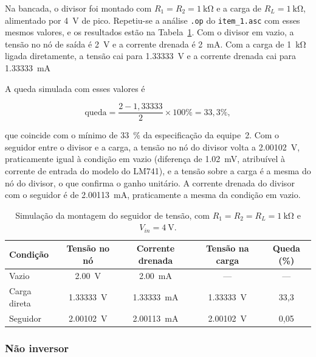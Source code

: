 \documentclass[11pt,a4paper]{article}
\begin{document}
Na bancada, o divisor foi montado com $R_1 = R_2 = \SI{1}{\kilo\ohm}$ e a carga de $R_L = \SI{1}{\kilo\ohm}$, alimentado por \SI{4}{\volt} de pico. Repetiu-se a análise \texttt{.op} do \texttt{item\_1.asc} com esses mesmos valores, e os resultados estão na Tabela~\ref{tab:seguidor_sim_bancada}. Com o divisor em vazio, a tensão no nó de saída é \SI{2}{\volt} e a corrente drenada é \SI{2}{\milli\ampere}. Com a carga de \SI{1}{\kilo\ohm} ligada diretamente, a tensão cai para \SI{1,33333}{\volt} e a corrente drenada cai para \SI{1,33333}{\milli\ampere}

A queda simulada com esses valores é

\begin{equation}
\text{queda} = \frac{2 - 1{,}33333}{2} \times 100\% = 33{,}3\% ,
\label{eq:queda_sim_bancada}
\end{equation}

que coincide com o mínimo de \SI{33}{\%} da especificação da equipe~2. Com o seguidor entre o divisor e a carga, a tensão no nó do divisor volta a \SI{2,00102}{\volt}, praticamente igual à condição em vazio (diferença de \SI{1,02}{\milli\volt}, atribuível à corrente de entrada do modelo do LM741), e a tensão sobre a carga é a mesma do nó do divisor, o que confirma o ganho unitário. A corrente drenada do divisor com o seguidor é de \SI{2,00113}{\milli\ampere}, praticamente a mesma da condição em vazio.

\begin{table}[h]
\centering
\caption{Simulação da montagem do seguidor de tensão, com $R_1 = R_2 = R_L = \SI{1}{\kilo\ohm}$ e $V_{in} = \SI{4}{\volt}$.}
\label{tab:seguidor_sim_bancada}
\begin{tabular}{lcccc}
\hline
Condição & Tensão no nó & Corrente drenada & Tensão na carga & Queda (\%) \\
\hline
Vazio & \SI{2,00}{\volt} & \SI{2,00}{\milli\ampere} & --- & --- \\
Carga direta & \SI{1,33333}{\volt} & \SI{1,33333}{\milli\ampere} & \SI{1,33333}{\volt} & 33,3 \\
Seguidor & \SI{2,00102}{\volt} & \SI{2,00113}{\milli\ampere} & \SI{2,00102}{\volt} & 0,05 \\
\hline
\end{tabular}
\end{table}

\subsubsection{Não inversor}
\end{document}
